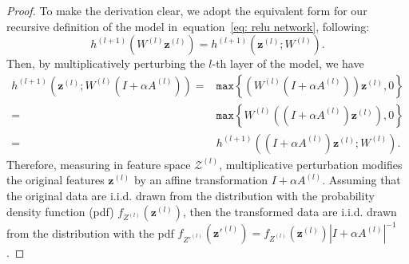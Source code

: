 \documentclass{article} \usepackage{iclr2022_conference,times}
\def\eqref#1{equation~\ref{#1}}
\begin{document}
\begin{proof}
To make the derivation clear, we adopt the equivalent form for our recursive definition of the model in~\eqref{eq: relu network}, following: 
\begin{equation}
    h^{(l+1)} (W^{(l)}\boldsymbol{z}^{(l)}) = h^{(l+1)}(\boldsymbol{z}^{(l)}; W^{(l)}).
\end{equation}
Then, by multiplicatively perturbing the $l$-th layer of the model, we have 
\begin{equation}
    \begin{aligned}
    h^{(l+1)}\left(\boldsymbol{z}^{(l)};W^{(l)}(I+\alpha A^{(l)})\right) =& \texttt{max}\left\{\left(W^{(l)}(I+\alpha A^{(l)})\right)\boldsymbol{z}^{(l)}, 0\right\} \\
=& \texttt{max}\left\{W^{(l)}\left((I+\alpha A^{(l)})\boldsymbol{z}^{(l)}\right), 0\right\}  \\
    =& h^{(l+1)}\left((I+\alpha A^{(l)}) \boldsymbol{z}^{(l)};W^{(l)}\right).
    \end{aligned}
\end{equation}
Therefore, measuring in feature space $\mathcal{Z}^{(l)}$, multiplicative perturbation modifies the original features $\boldsymbol{z}^{(l)}$ by an affine transformation $I+\alpha A^{(l)}$. Assuming that the original data are i.i.d. drawn from the distribution with the probability density function (pdf) $f_{Z^{(l)}}(\boldsymbol{z}^{(l)})$, then the transformed data are i.i.d. drawn from the distribution with the pdf $f_{{Z'}^{(l)}}(\boldsymbol{z}'^{(l)}) = f_{Z^{(l)}}(\boldsymbol{z}^{(l)})\left\lvert I+\alpha A^{(l)} \right\rvert^{-1}$. 


\end{proof}
\end{document}
